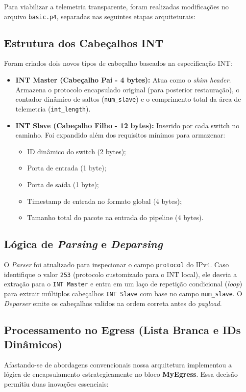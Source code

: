 Para viabilizar a telemetria transparente, foram realizadas modificações no arquivo \texttt{basic.p4}, separadas nas seguintes etapas arquiteturais:

\subsection{Estrutura dos Cabeçalhos INT}
Foram criados dois novos tipos de cabeçalho baseados na especificação INT:
\begin{itemize}
    \item \textbf{INT Master (Cabeçalho Pai - 4 bytes):} Atua como o \textit{shim header}. Armazena o protocolo encapsulado original (para posterior restauração), o contador dinâmico de saltos (\texttt{num\_slave}) e o comprimento total da área de telemetria (\texttt{int\_length}).
    \item \textbf{INT Slave (Cabeçalho Filho - 12 bytes):} Inserido por cada switch no caminho. Foi expandido além dos requisitos mínimos para armazenar:
    \begin{itemize}
        \item ID dinâmico do switch (2 bytes);
        \item Porta de entrada (1 byte);
        \item Porta de saída (1 byte);
        \item Timestamp de entrada no formato global (4 bytes);
        \item Tamanho total do pacote na entrada do pipeline (4 bytes).
    \end{itemize}
\end{itemize}

\subsection{Lógica de \textit{Parsing} e \textit{Deparsing}}
O \textit{Parser} foi atualizado para inspecionar o campo \texttt{protocol} do IPv4. Caso identifique o valor \texttt{253} (protocolo customizado para o INT local), ele desvia a extração para o \texttt{INT Master} e entra em um laço de repetição condicional (\textit{loop}) para extrair múltiplos cabeçalhos \texttt{INT Slave} com base no campo \texttt{num\_slave}. O \textit{Deparser} emite os cabeçalhos validos na ordem correta antes do \textit{payload}.

\subsection{Processamento no Egress (Lista Branca e IDs Dinâmicos)}
Afastando-se de abordagens convencionais nossa arquitetura implementou a lógica de encapsulamento estrategicamente no bloco \textbf{MyEgress}. Essa decisão permitiu duas inovações essenciais:

